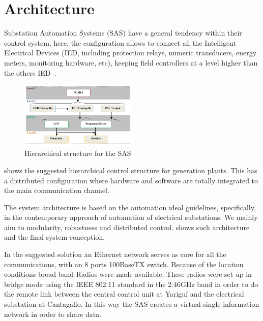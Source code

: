 
\section{Architecture}

Substation Automation Systems (SAS) have a general tendency
within their control system, here, the configuration allows to connect
all the Intelligent Electrical Devices (IED, including protection relays,
numeric transducers, energy meters, monitoring hardware, etc), keeping
field controllers at a level higher than the others
IED~\cite{rodriguez:2007}.

\begin{figure}
  \centering
  \includegraphics[width=0.5\textwidth]{img/sas.png}
  \caption{Hierarchical structure for the SAS}
  \label{fig:sas}
\end{figure}

 shows the suggested hierarchical control structure for
generation plants. This has a distributed configuration where hardware
and software are totally integrated to the main communication channel.

The system architecture is based on the automation ideal guidelines,
specifically, in the contemporary approach of automation of electrical
substations. We mainly aim to modularity, robustness and distributed
control.  shows such architecture and the final system
conception.

In the suggested solution an Ethernet network serves as core for all
the communications, with an 8 ports 100BaseTX switch. Because of the
location conditions broad band Radios were made available. These radios 
were set up in bridge mode using the IEEE 802.11 standard in the 2.46GHz 
band in order to do the remote link between the central control unit at
Yariguí and the electrical substation at Cantagallo. In this way the SAS
creates a virtual single information network in order to share data.

